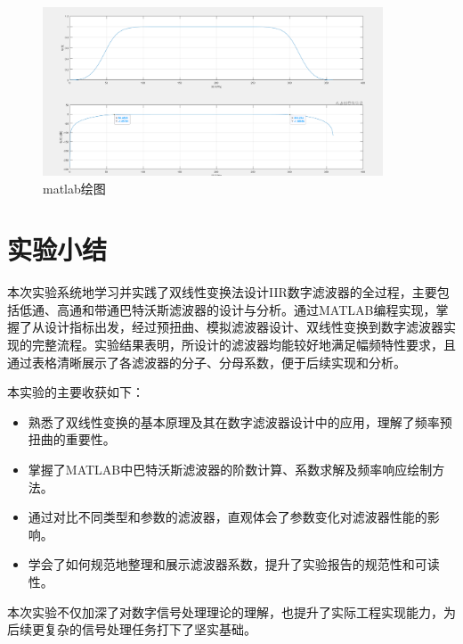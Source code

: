 \documentclass[12pt,hyperref,a4paper,UTF8]{ctexart}
\begin{document}
\begin{figure}[H] %
        \centering
        \includegraphics[width=0.9\textwidth]{figures/303.png} %
        \caption{matlab绘图} %
        \label{fig:example} %
\end{figure}



\section{实验小结}

本次实验系统地学习并实践了双线性变换法设计IIR数字滤波器的全过程，主要包括低通、高通和带通巴特沃斯滤波器的设计与分析。通过MATLAB编程实现，掌握了从设计指标出发，经过预扭曲、模拟滤波器设计、双线性变换到数字滤波器实现的完整流程。实验结果表明，所设计的滤波器均能较好地满足幅频特性要求，且通过表格清晰展示了各滤波器的分子、分母系数，便于后续实现和分析。

本实验的主要收获如下：

\begin{itemize}
    \item 熟悉了双线性变换的基本原理及其在数字滤波器设计中的应用，理解了频率预扭曲的重要性。
    \item 掌握了MATLAB中巴特沃斯滤波器的阶数计算、系数求解及频率响应绘制方法。
    \item 通过对比不同类型和参数的滤波器，直观体会了参数变化对滤波器性能的影响。
    \item 学会了如何规范地整理和展示滤波器系数，提升了实验报告的规范性和可读性。
\end{itemize}

本次实验不仅加深了对数字信号处理理论的理解，也提升了实际工程实现能力，为后续更复杂的信号处理任务打下了坚实基础。
\end{document}
